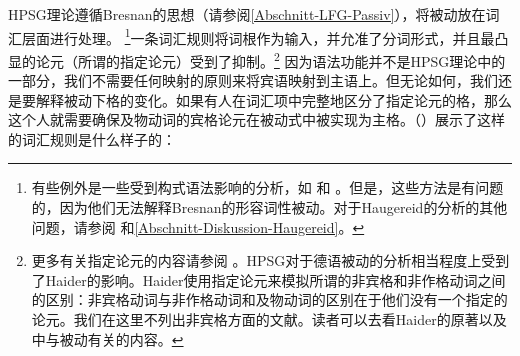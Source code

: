 HPSG理论遵循Bresnan的思想（请参阅\ref{Abschnitt-LFG-Passiv}），将被动放在词汇层面进行处理。
\footnote{%
有些例外是一些受到构式语法影响的分析，如 \citet{Tseng2007a}和 \citet{Haugereid2007a}。但是，这些方法是有问题的，因为他们无法解释Bresnan的形容词性被动。对于Haugereid的分析的其他问题，请参阅 和\ref{Abschnitt-Diskussion-Haugereid}。
}一条词汇规则将词根作为输入，并允准了分词形式，并且最凸显的论元（所谓的指定论元）受到了抑制。\footnote{%
更多有关指定论元的内容请参阅 。HPSG对于德语被动的分析相当程度上受到了Haider的影响。Haider使用指定论元来模拟所谓的非宾格和非作格动词之间的区别\citep{Perlmutter78}：非宾格动词与非作格动词和及物动词的区别在于他们没有一个指定的论元。我们在这里不列出非宾格方面的文献。读者可以去看Haider的原著以及 中与被动有关的内容。
}
因为语法功能并不是HPSG理论中的一部分，我们不需要任何映射的原则来将宾语映射到主语上。但无论如何，我们还是要解释被动下格的变化。如果有人在词汇项中完整地区分了指定论元的格，那么这个人就需要确保及物动词的宾格论元在被动式中被实现为主格。（）展示了这样的词汇规则是什么样子的：

